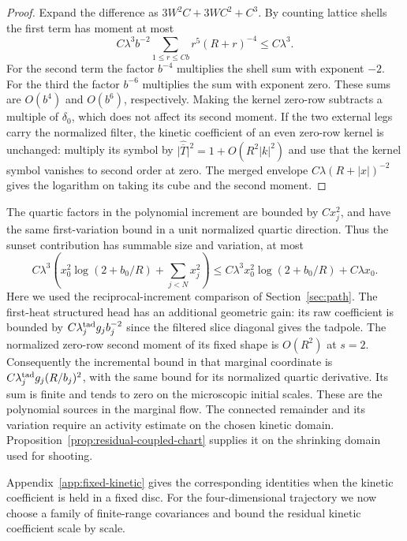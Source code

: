 \documentclass[11pt]{article}
\theoremstyle{definition}
\begin{document}
\begin{proof}
Expand the difference as \(3W^2 C+3 W C^2+C^3\).
By counting lattice shells the first term has moment at most
\begin{equation}
 C\lambda^3 b^{-2}
 \sum_{1\le r\le Cb} r^{5}(R+r)^{-4}\le C\lambda^3 .
\end{equation}
For the second term the factor \(b^{-4}\) multiplies the shell
sum with exponent \(-2\). For the third the factor \(b^{-6}\)
multiplies the sum with exponent zero. These sums are
\(O(b^4)\) and \(O(b^6)\), respectively. Making the kernel
zero-row subtracts a multiple of \(\delta_0\), which does not
affect its second moment. If the two external legs carry the
normalized filter, the kinetic coefficient of an even zero-row
kernel is unchanged: multiply its symbol by
\(\lvert\widehat{\overline T}\rvert^2=1+O(R^2|k|^2)\) and
use that the kernel symbol vanishes to second order at zero.
The merged envelope \(C\lambda(R+|x|)^{-2}\) gives the logarithm
on taking its cube and the second moment.
\end{proof}

The quartic factors in the polynomial increment are bounded by
\(C x_j^2\), and have the same first-variation bound in a unit
normalized quartic direction. Thus the sunset contribution has
summable size and variation, at most
\begin{equation}
 C\lambda^3\left(x_0^2\log(2+b_0/R)+\sum_{j<N}x_j^2\right)
 \le C\lambda^3 x_0^2\log(2+b_0/R)+C\lambda x_0 .
\end{equation}
Here we used the reciprocal-increment comparison of
Section~\ref{sec:path}. The first-heat structured head has an
additional geometric gain: its raw coefficient is bounded by
\(C\lambda_j^{\rm tad}g_j b_j^{-2}\) since the filtered slice
diagonal gives the tadpole. The normalized zero-row second
moment of its fixed shape is \(O(R^2)\) at \(s=2\).
Consequently the incremental bound in that marginal coordinate
is \(C\lambda_j^{\rm tad}g_j(R/b_j)^2\), with the same bound
for its normalized quartic derivative. Its sum is finite
and tends to zero on the microscopic initial scales. These are
the polynomial sources in the marginal flow. The connected
remainder and its variation require an activity estimate on the
chosen kinetic domain. Proposition~\ref{prop:residual-coupled-chart}
supplies it on the shrinking domain used for shooting.

Appendix~\ref{app:fixed-kinetic} gives the corresponding identities
when the kinetic coefficient is held in a fixed disc. For the
four-dimensional trajectory we now choose a family of finite-range
covariances and bound the residual kinetic coefficient scale by scale.
\end{document}
